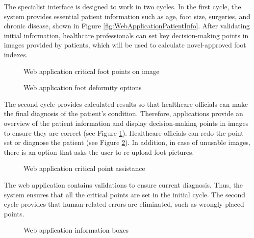 The specialist interface is designed to work in two cycles. In the first cycle, the system provides essential patient information such as age, foot size, surgeries, and chronic disease, shown in Figure \ref{fig:WebApplicationPatientInfo}. After validating initial information, healthcare professionals can set key decision-making points in images provided by patients, which will be used to calculate novel-approved foot indexes. 

\begin{figure}[htbp]
\centering
{}
\caption{Web application critical foot points on image}
\label{fig:WebApplicationFootPoints}
\end{figure}

\begin{figure}[htbp]
\centering
{}
\caption{Web application foot deformity options}
\label{fig:WebApplicationSetFootDeformity}
\end{figure}

The second cycle provides calculated results so that healthcare officials can make the final diagnosis of the patient's condition. Therefore, applications provide an overview of the patient information and display decision-making points in images to ensure they are correct (see Figure \ref{fig:WebApplicationFootPoints}). Healthcare officials can redo the point set or diagnose the patient (see Figure \ref{fig:WebApplicationSetFootDeformity}). In addition, in case of unusable images, there is an option that asks the user to re-upload foot pictures.

\begin{figure}[htbp]
\centering
{}
\caption{Web application critical point assistance}
\label{fig:WebApplicationCriticalPointAssistance}
\end{figure}

The web application contains validations to ensure current diagnosis. Thus, the system ensures that all the critical points are set in the initial cycle. The second cycle provides that human-related errors are eliminated, such as wrongly placed points. 

\begin{figure}[htbp]
\centering
{}
\caption{Web application information boxes}
\label{fig:WebApplicationInformationBoxes}
\end{figure}

